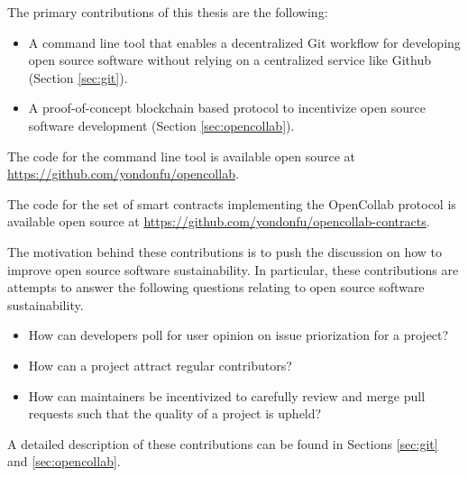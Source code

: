 The primary contributions of this thesis are the following:

\begin{itemize}
  \item A command line tool that enables a decentralized Git workflow for
    developing open source software without relying on a centralized service
    like Github (Section \ref{sec:git}).
  \item A proof-of-concept blockchain based protocol to incentivize open source
    software development (Section \ref{sec:opencollab}).
\end{itemize}

The code for the command line tool is available open source at \url{https://github.com/yondonfu/opencollab}.

The code for the set of smart contracts implementing the OpenCollab protocol is
available open source at \url{https://github.com/yondonfu/opencollab-contracts}.

The motivation behind these contributions is to push the discussion on how to
improve open source software sustainability. In particular, these contributions are
attempts to answer the following questions relating to open source software sustainability.

\begin{itemize}
  \item How can developers poll for user opinion on issue
    priorization for a project?
  \item How can a project attract regular contributors?
  \item How can maintainers be incentivized to carefully review and merge pull
    requests such that the quality of a project is upheld?
 \end{itemize}

A detailed description of these contributions can be found in Sections
\ref{sec:git} and \ref{sec:opencollab}.

